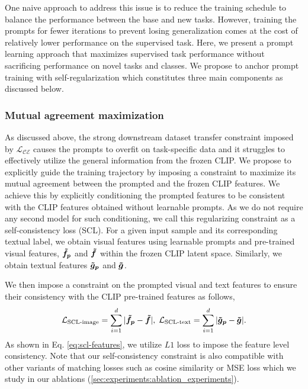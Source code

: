\documentclass[10pt,twocolumn,letterpaper]{article}
\begin{document}
One naive approach to address this issue is to reduce the training schedule to balance the performance between the base and new tasks. However, training the prompts for fewer iterations to prevent losing generalization comes at the cost of relatively lower performance on the supervised task. Here, we present a prompt learning approach that maximizes supervised task performance without sacrificing performance on novel tasks and classes. We propose to anchor prompt training with self-regularization which constitutes three main components as discussed below.

\subsubsection{Mutual agreement maximization}
\label{mutual_agreement_para}
As discussed above, the strong downstream dataset transfer constraint imposed by $\mathcal{L_{\text{CE}}}$ causes the prompts to overfit on task-specific data and it struggles to effectively utilize the general information from the frozen CLIP. We propose to explicitly guide the training trajectory by imposing a constraint to maximize its mutual agreement between the prompted and the frozen CLIP features. We achieve this by explicitly conditioning the prompted features to be consistent with the CLIP features obtained without learnable prompts. As we do not require any second model for such conditioning, we call this regularizing constraint as a self-consistency loss (SCL).
For a given input sample and its corresponding textual label, we obtain visual features using learnable prompts and pre-trained visual features, $\bm{\Tilde{f}_{p}}$ and $\bm{\Tilde{f}} $ within the frozen CLIP latent space. Similarly, we obtain textual features $\bm{\Tilde{g}_{p}}$ and $\bm{\Tilde{g}}$.

We then impose a constraint on the prompted visual and text features to ensure their consistency with the CLIP pre-trained features as follows,
\begin{align}
\label{eq:scl-features}
    \mathcal{L_{\text{SCL-image}}} = \sum_{i=1}^{d}|\bm{\Tilde{f}_{p}} - \bm{\Tilde{f}}|, \; 
    \mathcal{L_{\text{SCL-text}}} = \sum_{i=1}^{d} |\bm{\Tilde{g}_{p}} - \bm{\Tilde{g}}|.
\end{align}
As shown in Eq. \ref{eq:scl-features}, we utilize $L1$ loss to impose the feature level consistency. Note that our self-consistency constraint is also compatible with other variants of matching losses such as cosine similarity or MSE loss which we study in our ablations (\autoref{sec:experiments:ablation_experiments}).
\end{document}
